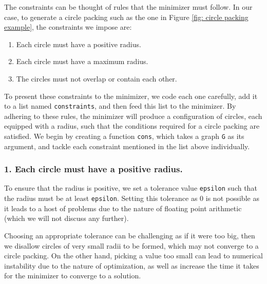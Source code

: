 \begin{flushleft}
The constraints can be thought of rules that the minimizer must follow. In our case, to generate a circle packing such as the one in Figure \ref{fig: circle packing example}, the constraints we impose are:

\begin{enumerate}
    \item Each circle must have a positive radius.
    \vspace{-3mm}
    \item Each circle must have a maximum radius.
    \vspace{-3mm}
    \item The circles must not overlap or contain each other.
\end{enumerate}

To present these constraints to the minimizer, we code each one carefully, add it to a list named \texttt{constraints}, and then feed this list to the minimizer. By adhering to these rules, the minimizer will produce a configuration of circles, each equipped with a radius, such that the conditions required for a circle packing are satisfied. We begin by creating a function \texttt{cons}, which takes a graph \texttt{G} as its argument, and tackle each constraint mentioned in the list above individually.
\end{flushleft}

\subsubsection{1. Each circle must have a positive radius.}

\begin{flushleft}
To ensure that the radius is positive, we set a tolerance value \texttt{epsilon} such that the radius must be at least \texttt{epsilon}. Setting this tolerance as 0 is not possible as it leads to a host of problems due to the nature of floating point arithmetic (which we will not discuss any further). 
\end{flushleft}

\begin{flushleft}
Choosing an appropriate tolerance can be challenging as if it were too big, then we disallow circles of very small radii to be formed, which may not converge to a circle packing. On the other hand, picking a value too small can lead to numerical instability due to the nature of optimization, as well as increase the time it takes for the minimizer to converge to a solution.
\end{flushleft}

